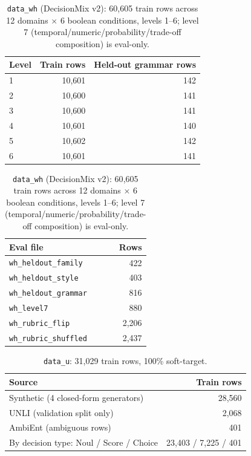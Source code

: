 \begin{table}[h]
  \centering
  \caption{\texttt{data\_wh} (DecisionMix v2): 60{,}605 train rows across 12 domains $\times$ 6 boolean
  conditions, levels 1--6; level 7 (temporal/numeric/probability/trade-off composition) is eval-only.}
  \label{tab:app-wh}
  \small
  \begin{tabular}{lrr}
    \toprule
    Level & Train rows & Held-out grammar rows \\
    \midrule
    1 & 10{,}601 & 142 \\
    2 & 10{,}600 & 141 \\
    3 & 10{,}600 & 141 \\
    4 & 10{,}601 & 140 \\
    5 & 10{,}602 & 142 \\
    6 & 10{,}601 & 141 \\
    \bottomrule
  \end{tabular}
  \quad
  \begin{tabular}{lr}
    \toprule
    Eval file & Rows \\
    \midrule
    \texttt{wh\_heldout\_family} & 422 \\
    \texttt{wh\_heldout\_style} & 403 \\
    \texttt{wh\_heldout\_grammar} & 816 \\
    \texttt{wh\_level7} & 880 \\
    \texttt{wh\_rubric\_flip} & 2{,}206 \\
    \texttt{wh\_rubric\_shuffled} & 2{,}437 \\
    \bottomrule
  \end{tabular}
\end{table}

\begin{table}[h]
  \centering
  \caption{\texttt{data\_u}: 31{,}029 train rows, 100\% soft-target.}
  \label{tab:app-u}
  \small
  \begin{tabular}{lr}
    \toprule
    Source & Train rows \\
    \midrule
    Synthetic (4 closed-form generators) & 28{,}560 \\
    UNLI (validation split only) & 2{,}068 \\
    AmbiEnt (ambiguous rows) & 401 \\
    \midrule
    By decision type: Noul / Score / Choice & 23{,}403 / 7{,}225 / 401 \\
    \bottomrule
  \end{tabular}
\end{table}

